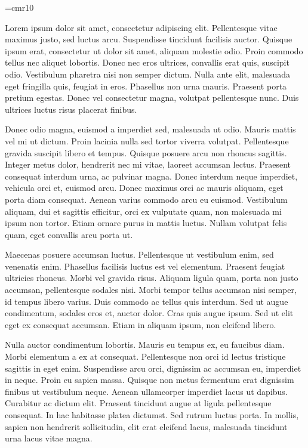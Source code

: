 \font\thefont=cmr10 \selectfont

Lorem ipsum dolor sit amet, consectetur adipiscing elit. Pellentesque vitae maximus justo, sed luctus arcu. Suspendisse tincidunt facilisis auctor. Quisque ipsum erat, consectetur ut dolor sit amet, aliquam molestie odio. Proin commodo tellus nec aliquet lobortis. Donec nec eros ultrices, convallis erat quis, suscipit odio. Vestibulum pharetra nisi non semper dictum. Nulla ante elit, malesuada eget fringilla quis, feugiat in eros. Phasellus non urna mauris. Praesent porta pretium egestas. Donec vel consectetur magna, volutpat pellentesque nunc. Duis ultrices luctus risus placerat finibus.

Donec odio magna, euismod a imperdiet sed, malesuada ut odio. Mauris mattis vel mi ut dictum. Proin lacinia nulla sed tortor viverra volutpat. Pellentesque gravida suscipit libero et tempus. Quisque posuere arcu non rhoncus sagittis. Integer metus dolor, hendrerit nec mi vitae, laoreet accumsan lectus. Praesent consequat interdum urna, ac pulvinar magna. Donec interdum neque imperdiet, vehicula orci et, euismod arcu. Donec maximus orci ac mauris aliquam, eget porta diam consequat. Aenean varius commodo arcu eu euismod. Vestibulum aliquam, dui et sagittis efficitur, orci ex vulputate quam, non malesuada mi ipsum non tortor. Etiam ornare purus in mattis luctus. Nullam volutpat felis quam, eget convallis arcu porta ut.

Maecenas posuere accumsan luctus. Pellentesque ut vestibulum enim, sed venenatis enim. Phasellus facilisis luctus est vel elementum. Praesent feugiat ultricies rhoncus. Morbi vel gravida risus. Aliquam ligula quam, porta non justo accumsan, pellentesque sodales nisi. Morbi tempor tellus accumsan nisi semper, id tempus libero varius. Duis commodo ac tellus quis interdum. Sed ut augue condimentum, sodales eros et, auctor dolor. Cras quis augue ipsum. Sed ut elit eget ex consequat accumsan. Etiam in aliquam ipsum, non eleifend libero.

Nulla auctor condimentum lobortis. Mauris eu tempus ex, eu faucibus diam. Morbi elementum a ex at consequat. Pellentesque non orci id lectus tristique sagittis in eget enim. Suspendisse arcu orci, dignissim ac accumsan eu, imperdiet in neque. Proin eu sapien massa. Quisque non metus fermentum erat dignissim finibus ut vestibulum neque. Aenean ullamcorper imperdiet lacus ut dapibus. Curabitur ac dictum elit. Praesent tincidunt augue at ligula pellentesque consequat. In hac habitasse platea dictumst. Sed rutrum luctus porta. In mollis, sapien non hendrerit sollicitudin, elit erat eleifend lacus, malesuada tincidunt urna lacus vitae magna.

